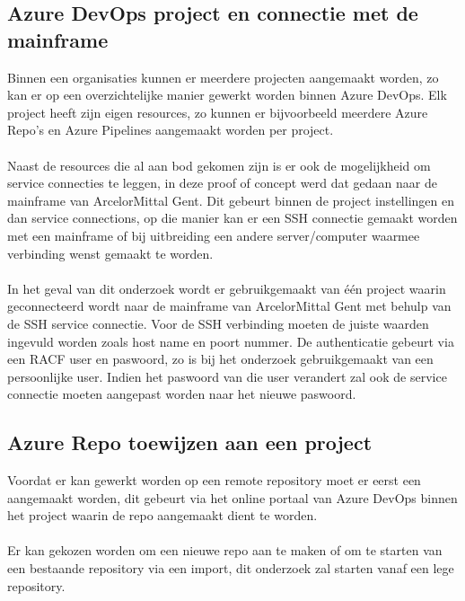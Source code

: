 \subsection{Azure DevOps project en connectie met de mainframe}
Binnen een organisaties kunnen er meerdere projecten aangemaakt worden, zo kan er op een overzichtelijke manier gewerkt worden binnen Azure DevOps. Elk project heeft zijn eigen resources, zo kunnen er bijvoorbeeld meerdere Azure Repo's en Azure Pipelines aangemaakt worden per project. 
\\ \\
Naast de resources die al aan bod gekomen zijn is er ook de mogelijkheid om service connecties te leggen, in deze proof of concept werd dat gedaan naar de mainframe van ArcelorMittal Gent. Dit gebeurt binnen de project instellingen en dan service connections, op die manier kan er een SSH connectie gemaakt worden met een mainframe of bij uitbreiding een andere server/computer waarmee verbinding wenst gemaakt te worden. 
\\ \\
In het geval van dit onderzoek wordt er gebruikgemaakt van één project waarin geconnecteerd wordt naar de mainframe van ArcelorMittal Gent met behulp van de SSH service connectie. Voor de SSH verbinding moeten de juiste waarden ingevuld worden zoals host name en poort nummer. De authenticatie gebeurt via een RACF user en paswoord, zo is bij het onderzoek gebruikgemaakt van een persoonlijke user. Indien het paswoord van die user verandert zal ook de service connectie moeten aangepast worden naar het nieuwe paswoord.

\subsection{Azure Repo toewijzen aan een project}
Voordat er kan gewerkt worden op een remote repository moet er eerst een aangemaakt worden, dit gebeurt via het online portaal van Azure DevOps binnen het project waarin de repo aangemaakt dient te worden. 
\\ \\ 
Er kan gekozen worden om een nieuwe repo aan te maken of om te starten van een bestaande repository via een import, dit onderzoek zal starten vanaf een lege repository. 

